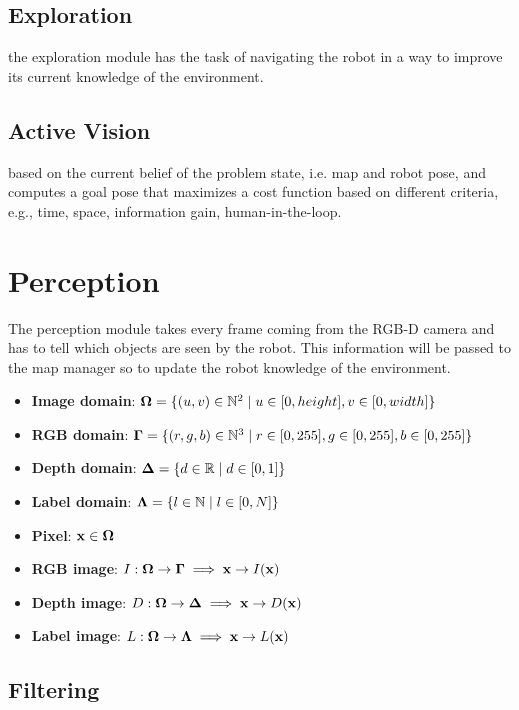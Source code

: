\documentclass{article}
\begin{document}
	\subsection{Exploration} the exploration module has the task of navigating the robot in a way to improve its current knowledge of the environment. 
	
	\subsection{Active Vision} based on the current belief of the problem state, i.e. map and robot pose, and computes a goal pose that maximizes a cost function based on different criteria, e.g., time, space, information gain, human-in-the-loop.
		
	\section{Perception}

	The perception module takes every frame coming from the RGB-D camera and has to tell which objects are seen by the robot. This information will be passed to the map manager so to update the robot knowledge of the environment.
		
	\begin{itemize}
		\item {\bf Image domain}: $\mathbf{\Omega} = \{(u,v) \in \mathbb{N}^2 \mid u \in [0,height], v \in [0,width]\}$
		\item {\bf RGB domain}: $\mathbf{\Gamma} = \{(r,g,b) \in \mathbb{N}^3 \mid r \in [0,255], g \in [0,255], b \in [0,255]\}$
		\item {\bf Depth domain}: $\mathbf{\Delta} = \{ d \in \mathbb{R} \mid d \in [0,1]\}$
		\item {\bf Label domain}: $\mathbf{\Lambda} = \{ l \in \mathbb{N} \mid l \in [0,N]\}$
		\item {\bf Pixel}: $\mathbf{x} \in \mathbf{\Omega}$
		\item {\bf RGB image}: $I : \mathbf{\Omega} \rightarrow \mathbf{\Gamma} \implies \mathbf{x} \rightarrow I(\mathbf{x})$
		\item {\bf Depth image}: $D : \mathbf{\Omega} \rightarrow \mathbf{\Delta} \implies \mathbf{x} \rightarrow D(\mathbf{x})$
		\item {\bf Label image}: $L : \mathbf{\Omega} \rightarrow \mathbf{\Lambda} \implies \mathbf{x} \rightarrow L(\mathbf{x})$
	\end{itemize}
	
	\subsection{Filtering}
	
\end{document}
